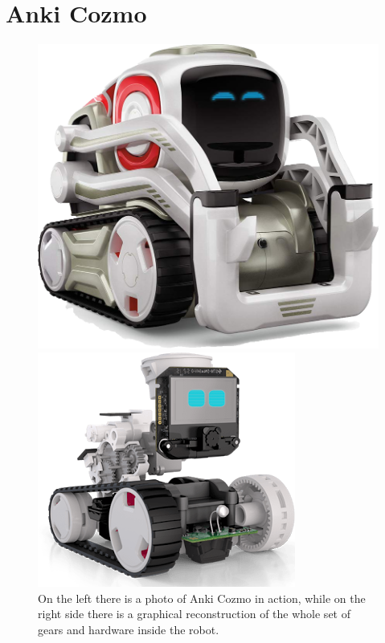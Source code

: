 \section{Anki Cozmo}

\begin{figure}

	\begin{minipage}[t]{0.48\linewidth}
		\centering
		\includegraphics[height=0.25\paperwidth]{img/cozmo_inside_1.png}
	\end{minipage}
	\begin{minipage}[t]{0.48\linewidth}
		\centering
		\includegraphics[height=0.25\paperwidth]{img/cozmo_inside_2.png}
	\end{minipage}

	\caption[Anki Cozmo Robot]{On the left there is a photo of Anki Cozmo in action, while on the right side there is a graphical reconstruction of the whole set of gears and hardware inside the robot.}
	\label{fig:cozmo_inside}
\end{figure}

